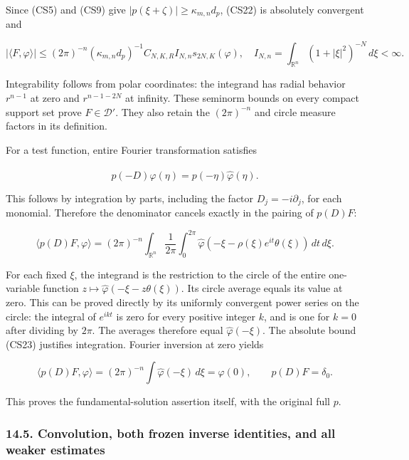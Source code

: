 \documentclass[
  11pt,
]{article}
\makeatletter
\let\ReaderOriginalAnchorStart\hyper@anchorstart
\let\ReaderOriginalAnchorEnd\hyper@anchorend
\let\ReaderPendingAliases\@empty
\def\ReaderArmAliases#1{\gdef\ReaderPendingAliases{#1}}
\def\hyper@anchorstart#1{\ReaderIfNativeAnchorTF{#1}{\ReaderPendingAliases\global\let\ReaderPendingAliases\@empty}{}\ReaderOriginalAnchorStart{#1}}
\makeatother
\begin{document}
Since (CS5) and (CS9) give \(|p(\xi+\zeta)|\geq\kappa_{m,n}d_p\), (CS22)
is absolutely convergent and

\[
 |\langle F,\varphi\rangle|
 \leq(2\pi)^{-n}(\kappa_{m,n}d_p)^{-1}C_{N,K,R}I_{N,n}
                                     s_{2N,K}(\varphi),
 \quad I_{N,n}=\int_{\mathbb R^n}(1+|\xi|^2)^{-N}\,d\xi<\infty.
                                                                    \tag{CS25}
\]

Integrability follows from polar coordinates: the integrand has radial
behavior \(r^{n-1}\) at zero and \(r^{n-1-2N}\) at infinity. These
seminorm bounds on every compact support set prove \(F\in\mathcal D'\).
They also retain the \((2\pi)^{-n}\) and circle measure factors in its
definition.

For a test function, entire Fourier transformation satisfies

\[
 \widehat{p(-D)\varphi}(\eta)=p(-\eta)\widehat\varphi(\eta).
\]

This follows by integration by parts, including the factor
\(D_j=-i\partial_j\), for each monomial. Therefore the denominator
cancels exactly in the pairing of \(p(D)F\):

\[
 \langle p(D)F,\varphi\rangle
 =(2\pi)^{-n}\int_{\mathbb R^n}\frac1{2\pi}\int_0^{2\pi}
             \widehat\varphi(-\xi-\rho(\xi)e^{it}\theta(\xi))\,dt\,d\xi.
                                                                    \tag{CS26}
\]

For each fixed \(\xi\), the integrand is the restriction to the circle
of the entire one-variable function
\(z\mapsto\widehat\varphi(-\xi-z\theta(\xi))\). Its circle average
equals its value at zero. This can be proved directly by its uniformly
convergent power series on the circle: the integral of \(e^{ikt}\) is
zero for every positive integer \(k\), and is one for \(k=0\) after
dividing by \(2\pi\). The averages therefore equal
\(\widehat\varphi(-\xi)\). The absolute bound (CS23) justifies
integration. Fourier inversion at zero yields

\[
 \langle p(D)F,\varphi\rangle
       =(2\pi)^{-n}\int\widehat\varphi(-\xi)\,d\xi
       =\varphi(0),\qquad p(D)F=\delta_0.                     \tag{CS27}
\]

This proves the fundamental-solution assertion itself, with the original
full \(p\).

\ReaderArmAliases{\ReaderOriginalAnchorStart{convolution-both-frozen-inverse-identities-and-all-weaker-estimates}\ReaderOriginalAnchorEnd}
\subsubsection{14.5. Convolution, both frozen inverse identities, and
all weaker
estimates}\label{convolution-both-frozen-inverse-identities-and-all-weaker-estimates}
\end{document}

